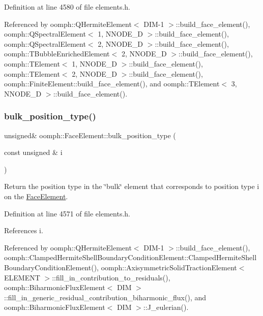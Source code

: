 Definition at line 4580 of file elements.\+h.



Referenced by oomph\+::\+Q\+Hermite\+Element$<$ D\+I\+M-\/1 $>$\+::build\+\_\+face\+\_\+element(), oomph\+::\+Q\+Spectral\+Element$<$ 1, N\+N\+O\+D\+E\+\_\+D $>$\+::build\+\_\+face\+\_\+element(), oomph\+::\+Q\+Spectral\+Element$<$ 2, N\+N\+O\+D\+E\+\_\+D $>$\+::build\+\_\+face\+\_\+element(), oomph\+::\+T\+Bubble\+Enriched\+Element$<$ 2, N\+N\+O\+D\+E\+\_\+D $>$\+::build\+\_\+face\+\_\+element(), oomph\+::\+T\+Element$<$ 1, N\+N\+O\+D\+E\+\_\+D $>$\+::build\+\_\+face\+\_\+element(), oomph\+::\+T\+Element$<$ 2, N\+N\+O\+D\+E\+\_\+D $>$\+::build\+\_\+face\+\_\+element(), oomph\+::\+Finite\+Element\+::build\+\_\+face\+\_\+element(), and oomph\+::\+T\+Element$<$ 3, N\+N\+O\+D\+E\+\_\+D $>$\+::build\+\_\+face\+\_\+element().

\mbox{\label{classoomph_1_1FaceElement_a0800385f7d11703d4bbae06e1c322b04}} 
\subsubsection{\texorpdfstring{bulk\+\_\+position\+\_\+type()}{bulk\_position\_type()}\hspace{0.1cm}{\footnotesize\ttfamily [1/2]}}
{\footnotesize\ttfamily unsigned\& oomph\+::\+Face\+Element\+::bulk\+\_\+position\+\_\+type (\begin{DoxyParamCaption}\item[{const unsigned \&}]{i }\end{DoxyParamCaption})\hspace{0.3cm}{\ttfamily [inline]}}



Return the position type in the \char`\"{}bulk\char`\"{} element that corresponds to position type i on the \hyperlink{classoomph_1_1FaceElement}{Face\+Element}. 



Definition at line 4571 of file elements.\+h.



References i.



Referenced by oomph\+::\+Q\+Hermite\+Element$<$ D\+I\+M-\/1 $>$\+::build\+\_\+face\+\_\+element(), oomph\+::\+Clamped\+Hermite\+Shell\+Boundary\+Condition\+Element\+::\+Clamped\+Hermite\+Shell\+Boundary\+Condition\+Element(), oomph\+::\+Axisymmetric\+Solid\+Traction\+Element$<$ E\+L\+E\+M\+E\+N\+T $>$\+::fill\+\_\+in\+\_\+contribution\+\_\+to\+\_\+residuals(), oomph\+::\+Biharmonic\+Flux\+Element$<$ D\+I\+M $>$\+::fill\+\_\+in\+\_\+generic\+\_\+residual\+\_\+contribution\+\_\+biharmonic\+\_\+flux(), and oomph\+::\+Biharmonic\+Flux\+Element$<$ D\+I\+M $>$\+::\+J\+\_\+eulerian().

